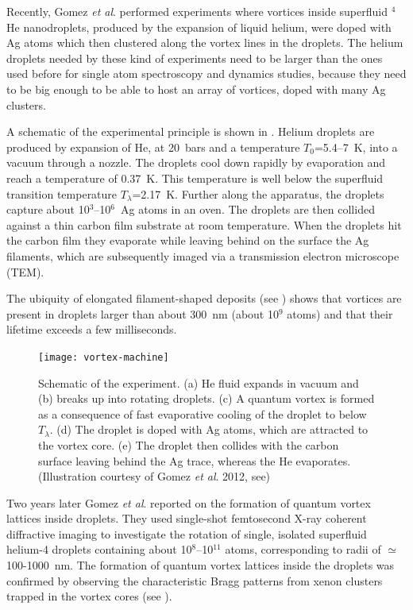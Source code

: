 		Recently, Gomez \emph{et al}. performed experiments\citep{Gomez:2012} where vortices inside superfluid $^4$He nanodroplets, produced by the expansion of liquid helium, were doped with Ag atoms which then clustered along the vortex lines in the droplets. The helium droplets needed by these kind of experiments need to be larger than the ones used before for single atom spectroscopy and dynamics studies, because they need to be big enough to be able to host an array of vortices, doped with many Ag clusters.
		
		A schematic of the experimental principle is shown in . Helium droplets are produced by expansion of He, at 20~bars and a temperature $T_0$=5.4--7~K, into a vacuum through a nozzle. The droplets cool down rapidly by evaporation and reach a temperature of 0.37~K\citep{Hartmann1995}. This temperature is well below the superfluid transition temperature $T_\lambda$=2.17~K\citep{Don91,Pit03}. Further along the apparatus, the droplets capture about 10$^3$–10$^6$~Ag atoms in an oven\citep{Log11d}. The droplets are then collided against a thin carbon film substrate at room temperature\citep{Log11d}. When the droplets hit the carbon film they evaporate while leaving behind on the surface the Ag filaments, which are subsequently imaged via a transmission electron microscope (TEM).
		
		The ubiquity of elongated filament-shaped deposits (see ) shows that vortices are present in droplets larger than about 300~nm (about 10$^9$ atoms) and that their lifetime exceeds a few milliseconds.
		
		\begin{figure}[t]
			\begin{center}
				\texttt{[image: vortex-machine]}
				\caption{Schematic of the experiment. (a) He fluid expands in vacuum and (b) breaks up into rotating droplets. (c) A quantum vortex is formed as a consequence of fast evaporative cooling of the droplet to below $T_\lambda$. (d) The droplet is doped with Ag atoms, which are attracted to the vortex core. (e) The droplet then collides with the carbon surface leaving behind the Ag trace, whereas the He evaporates. (Illustration courtesy of Gomez \emph{et al}. 2012, see)}
				\label{fig:vortex-machine}
			\end{center}
		\end{figure}	
		
		Two years later Gomez \emph{et al}. reported\citep{Gom14} on the formation of quantum vortex lattices inside droplets. They used single-shot femtosecond X-ray coherent diffractive imaging to investigate the rotation of single, isolated superfluid helium-4 droplets containing about 10$^8$--10$^{11}$ atoms, corresponding to radii of $\simeq$100-1000~nm. The formation of quantum vortex lattices inside the droplets was confirmed by observing the characteristic Bragg patterns from xenon clusters trapped in the vortex cores (see ).
	
